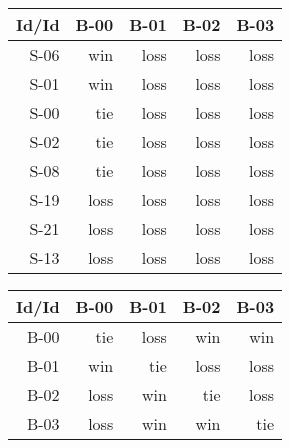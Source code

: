 \begin{tabular}{ | r | r | r | r | r | }
    \hline
        Id/Id  &   B-00  &   B-01  &   B-02  &   B-03  \\
    \hline
    \hline
         S-06  &    win  &   loss  &   loss  &   loss  \\
    \hline
         S-01  &    win  &   loss  &   loss  &   loss  \\
    \hline
         S-00  &    tie  &   loss  &   loss  &   loss  \\
    \hline
         S-02  &    tie  &   loss  &   loss  &   loss  \\
    \hline
         S-08  &    tie  &   loss  &   loss  &   loss  \\
    \hline
         S-19  &   loss  &   loss  &   loss  &   loss  \\
    \hline
         S-21  &   loss  &   loss  &   loss  &   loss  \\
    \hline
         S-13  &   loss  &   loss  &   loss  &   loss  \\
    \hline
\end{tabular}


\begin{tabular}{ | r | r | r | r | r | }
    \hline
        Id/Id  &   B-00  &   B-01  &   B-02  &   B-03  \\
    \hline
    \hline
         B-00  &    tie  &   loss  &    win  &    win  \\
    \hline
         B-01  &    win  &    tie  &   loss  &   loss  \\
    \hline
         B-02  &   loss  &    win  &    tie  &   loss  \\
    \hline
         B-03  &   loss  &    win  &    win  &    tie  \\
    \hline
\end{tabular}




